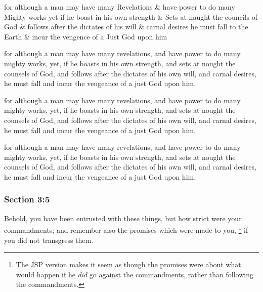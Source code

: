 		\begin{framed}
		\scriptsize
			\begin{compactdesc}
				\item[JSP] for although a man may have many Revelations \& have power to do many Mighty works yet if he boast in his own strength \& Sets at naught the councils of God \& follows after the dictates of his will \& carnal desires he must fall to the Earth \& incur the vengence of a Just God upon him
				\item[BC] for although a man may have many revelations, and have power to do many mighty works, yet, if he boasts in his own strength, and sets at nought the counsels of God, and follows after the dictates of his own will, and carnal desires, he must fall and incur the vengeance of a just God upon him.
				\item[DC 1835] for although a man may have many revelations, and have power to do many mighty works, yet, if he boasts in his own strength, and sets at nought the counsels of God, and follows after the dictates of his own will, and carnal desires, he must fall and incur the vengeance of a just God upon him.
				\item[DC 1844] for although a man may have many revelations, and have power to do many mighty works, yet, if he boasts in his own strength, and sets at nought the counsels of God, and follows after the dictates of his own will, and carnal desires, he must fall and incur the vengeance of a just God upon him.
			\end{compactdesc}
		\end{framed}

	\subsubsection{Section 3:5} %
		\label{DC3-5}

		Behold, you have been entrusted with these things, but how strict were your commandments; and remember also the promises which were made to you,%
			\footnote{%
				The JSP version makes it seem as though the promises were about what would happen if he \textit{did} go against the commandments, rather than following the commandments.
				}
		if you did not transgress them.

